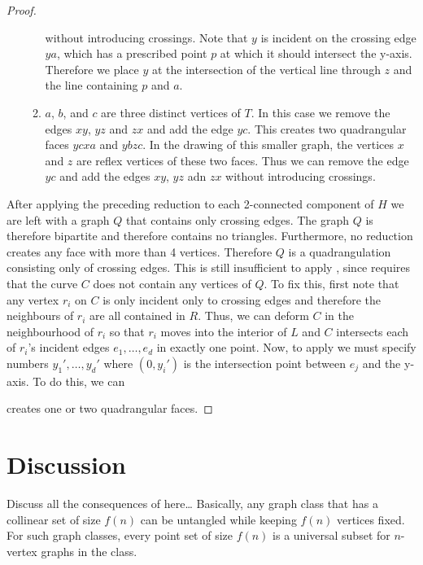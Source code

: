 \documentclass{patmorin}
\begin{document}
\begin{proof}
\begin{enumerate}
\begin{enumerate}
            without introducing crossings.  Note that $y$ is incident
            on the crossing edge $ya$, which has a prescribed point $p$
            at which it should intersect the y-axis.  Therefore we place
            $y$ at the intersection of the vertical line through $z$
            and the line containing $p$ and $a$.
          \item $a$, $b$, and $c$ are three distinct vertices of $T$.
            In this case we remove the edges $xy$, $yz$ and $zx$ and add
            the edge $yc$.  This creates two quadrangular faces $ycxa$
            and $ybzc$.  In the drawing of this smaller graph, the
            vertices $x$ and $z$ are reflex vertices of these two faces.
            Thus we can remove the edge $yc$ and add the edges $xy$,
            $yz$ adn $zx$ without introducing crossings.
      \end{enumerate}
   \end{enumerate}

   After applying the preceding reduction to each 2-connected component
   of $H$ we are left with a graph $Q$ that contains only crossing
   edges.  The graph $Q$ is therefore bipartite and therefore contains
   no triangles.  Furthermore, no reduction creates any face with more
   than 4 vertices. Therefore $Q$ is a quadrangulation consisting only
   of crossing edges.  This is still insufficient to apply ,
   since  requires that the curve $C$ does not contain any
   vertices of $Q$.  To fix this, first note that any vertex $r_i$
   on $C$ is only incident only to crossing edges and therefore
   the neighbours of $r_i$ are all contained in $R$. Thus, we can
   deform $C$ in the neighbourhood of $r_i$ so that $r_i$ moves into
   the interior of $L$ and $C$ intersects each of $r_i$'s incident
   edges $e_1,\ldots,e_d$ in exactly one point.  Now, to apply  we must specify numbers $y_1',\ldots,y_d'$ where $(0,y_i')$ is the intersection point between $e_j$ and the y-axis.  To do this, we can 


   creates one or two quadrangular faces.
\end{proof}



\section{Discussion}

Discuss all the consequences of  here\ldots
Basically, any graph class that has a collinear set of size $f(n)$ can 
be untangled while keeping $f(n)$ vertices fixed.  For such graph classes,
every point set of size $f(n)$ is a universal subset for $n$-vertex graphs
in the class.
\end{document}
